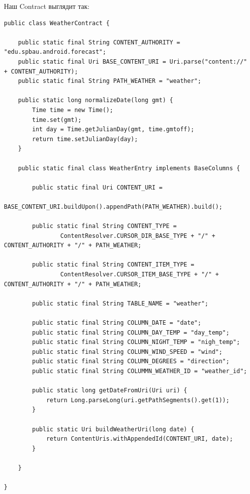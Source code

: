\documentclass[12 pt]{article}
\begin{document}
	Наш Contract выглядит так:
	\begin{lstlisting}
public class WeatherContract {

    public static final String CONTENT_AUTHORITY = "edu.spbau.android.forecast";
    public static final Uri BASE_CONTENT_URI = Uri.parse("content://" + CONTENT_AUTHORITY);
    public static final String PATH_WEATHER = "weather";

    public static long normalizeDate(long gmt) {
        Time time = new Time();
        time.set(gmt);
        int day = Time.getJulianDay(gmt, time.gmtoff);
        return time.setJulianDay(day);
    }

    public static final class WeatherEntry implements BaseColumns {

        public static final Uri CONTENT_URI =
                BASE_CONTENT_URI.buildUpon().appendPath(PATH_WEATHER).build();

        public static final String CONTENT_TYPE =
                ContentResolver.CURSOR_DIR_BASE_TYPE + "/" + CONTENT_AUTHORITY + "/" + PATH_WEATHER;

        public static final String CONTENT_ITEM_TYPE =
                ContentResolver.CURSOR_ITEM_BASE_TYPE + "/" + CONTENT_AUTHORITY + "/" + PATH_WEATHER;

        public static final String TABLE_NAME = "weather";

        public static final String COLUMN_DATE = "date";
        public static final String COLUMN_DAY_TEMP = "day_temp";
        public static final String COLUMN_NIGHT_TEMP = "nigh_temp";
        public static final String COLUMN_WIND_SPEED = "wind";
        public static final String COLUMN_DEGREES = "direction";
        public static final String COLUMMN_WEATHER_ID = "weather_id";

        public static long getDateFromUri(Uri uri) {
            return Long.parseLong(uri.getPathSegments().get(1));
        }

        public static Uri buildWeatherUri(long date) {
            return ContentUris.withAppendedId(CONTENT_URI, date);
        }

    }

}	
	\end{lstlisting}
	
\end{document}
